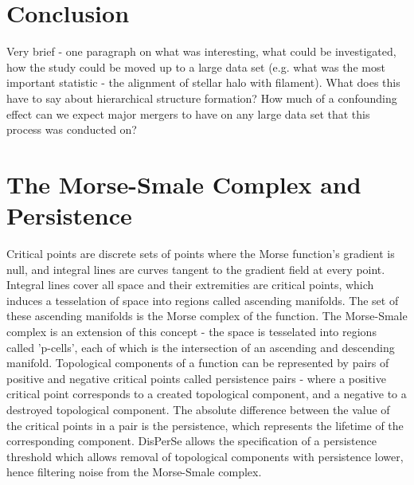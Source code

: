 \documentclass[journal]{IEEEtran}
\begin{document}
\section{Conclusion}
Very brief - one paragraph on what was interesting, what could be investigated, how the study could be moved up to a large data set (e.g. what was the most important statistic - the alignment of stellar halo with filament).
What does this have to say about hierarchical structure formation? How much of a confounding effect can we expect major mergers to have on any large data set that this process was conducted on?


\appendices
\section{The Morse-Smale Complex and Persistence}
Critical points are discrete sets of points where the Morse function's gradient is null, and integral lines are curves tangent to the gradient field at every point. Integral lines cover all space and their extremities are critical points, which induces a tesselation of space into regions called ascending manifolds. The set of these ascending manifolds is the Morse complex of the function. The Morse-Smale complex is an extension of this concept - the space is tesselated into regions called 'p-cells', each of which is the intersection of an ascending and descending manifold. 
Topological components of a function can be represented by pairs of positive and negative critical points called persistence pairs - where a positive critical point corresponds to a created topological component, and a negative to a destroyed topological component. The absolute difference between the value of the critical points in a pair is the persistence, which represents the lifetime of the corresponding component. DisPerSe allows the specification of a persistence threshold which allows removal of topological components with persistence lower, hence filtering noise from the Morse-Smale complex. 
\end{document}
